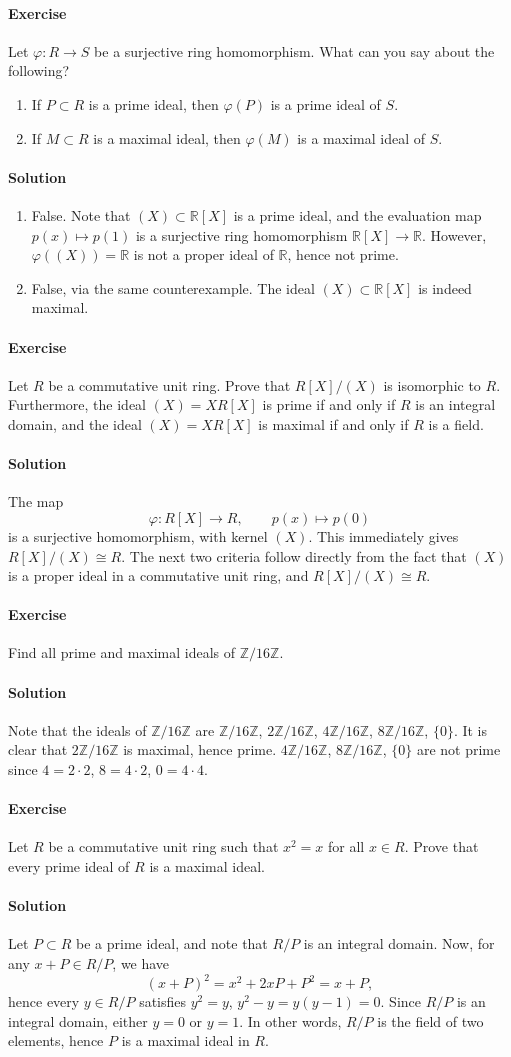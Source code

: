 \documentclass[10pt]{article}
\newcounter{prob}
\newcommand{\problem}{\stepcounter{prob}\paragraph{Exercise \arabic{prob}}}
\newcommand{\solution}{\paragraph{Solution}}
\newcommand{\R}{\mathbb{R}}
\newcommand{\Z}{\mathbb{Z}}
\begin{document}
    \problem Let $\varphi\colon R \to S$ be a surjective ring homomorphism. What can
    you say about the following?
    \begin{enumerate}
        \item If $P \subset R$ is a prime ideal, then $\varphi(P)$ is a prime ideal
        of $S$.
        \item If $M \subset R$ is a maximal ideal, then $\varphi(M)$ is a maximal
        ideal of $S$.
    \end{enumerate}

    \solution \mbox{}
    \begin{enumerate}
        \item False. Note that $(X) \subset \R[X]$ is a prime ideal, and the
        evaluation map $p(x) \mapsto p(1)$ is a surjective ring homomorphism $\R[X]
        \to \R$. However, $\varphi((X)) = \R$ is not a proper ideal of $\R$, hence
        not prime.

        \item False, via the same counterexample. The ideal $(X) \subset \R[X]$ is
        indeed maximal.
    \end{enumerate}


    \problem Let $R$ be a commutative unit ring. Prove that $R[X]/(X)$ is isomorphic
    to $R$. Furthermore, the ideal $(X) = X R[X]$ is prime if and only if $R$ is an
    integral domain, and the ideal $(X) = X R[X]$ is maximal if and only if $R$ is a
    field.

    \solution The map \[
        \varphi\colon R[X] \to R, \qquad p(x) \mapsto p(0)
    \] is a surjective homomorphism, with kernel $(X)$. This immediately gives $R[X]
    / (X) \cong R$. The next two criteria follow directly from the fact that $(X)$ is
    a proper ideal in a commutative unit ring, and $R[X] / (X) \cong R$.


    \problem Find all prime and maximal ideals of $\Z / 16\Z$.

    \solution Note that the ideals of $\Z/16\Z$ are $\Z/16\Z$, $2\Z/16\Z$, $4\Z/16\Z$,
    $8\Z/16\Z$, $\{0\}$. It is clear that $2\Z/16\Z$ is maximal, hence prime.
    $4\Z/16\Z$, $8\Z/16\Z$, $\{0\}$ are not prime since $4 = 2\cdot 2$, $8 = 4\cdot
    2$, $0 = 4\cdot 4$.


    \problem Let $R$ be a commutative unit ring such that $x^2 = x$ for all $x \in
    R$. Prove that every prime ideal of $R$ is a maximal ideal.

    \solution Let $P \subset R$ be a prime ideal, and note that $R/P$ is an integral
    domain. Now, for any $x + P \in R/P$, we have \[
        (x + P)^2 = x^2 + 2xP + P^2 = x + P,
    \] hence every $y \in R/P$ satisfies $y^2 = y$, $y^2 - y = y(y - 1) = 0$. Since
    $R/P$ is an integral domain, either $y = 0$ or $y = 1$. In other words, $R/P$ is
    the field of two elements, hence $P$ is a maximal ideal in $R$.
\end{document}
